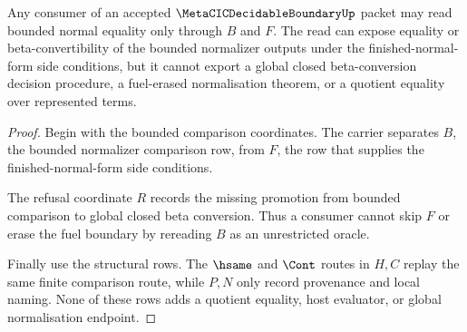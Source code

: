 \begin{theorem}
\label{thm:metacic-decidable-boundary-bounded-comparison-nonescape}
Any consumer of an accepted $\MetaCICDecidableBoundaryUp$ packet may read bounded normal equality only through $B$ and $F$. The read can expose equality or beta-convertibility of the bounded normalizer outputs under the finished-normal-form side conditions, but it cannot export a global closed beta-conversion decision procedure, a fuel-erased normalisation theorem, or a quotient equality over represented terms.
\end{theorem}
\begin{proof}
Begin with the bounded comparison coordinates. The carrier separates $B$, the bounded normalizer comparison row, from $F$, the row that supplies the finished-normal-form side conditions.

The refusal coordinate $R$ records the missing promotion from bounded comparison to global closed beta conversion. Thus a consumer cannot skip $F$ or erase the fuel boundary by rereading $B$ as an unrestricted oracle.

Finally use the structural rows. The $\hsame$ and $\Cont$ routes in $H,C$ replay the same finite comparison route, while $P,N$ only record provenance and local naming. None of these rows adds a quotient equality, host evaluator, or global normalisation endpoint.
\end{proof}

